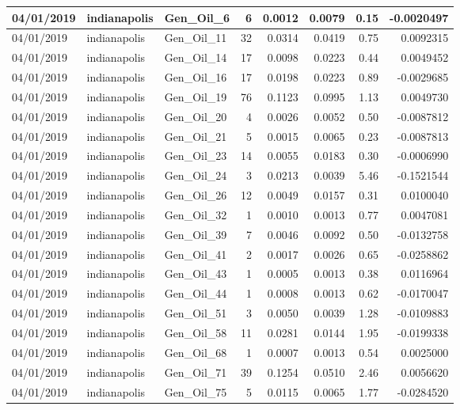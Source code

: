 \documentclass[
  letterpaper,
  DIV=11,
  numbers=noendperiod]{scrartcl}
\begin{document}
\begin{tabular}{l|l|l|r|r|r|r|r}
\hline
04/01/2019 & indianapolis & Gen\_Oil\_6 & 6 & 0.0012 & 0.0079 & 0.15 & -0.0020497\\
\hline
04/01/2019 & indianapolis & Gen\_Oil\_11 & 32 & 0.0314 & 0.0419 & 0.75 & 0.0092315\\
\hline
04/01/2019 & indianapolis & Gen\_Oil\_14 & 17 & 0.0098 & 0.0223 & 0.44 & 0.0049452\\
\hline
04/01/2019 & indianapolis & Gen\_Oil\_16 & 17 & 0.0198 & 0.0223 & 0.89 & -0.0029685\\
\hline
04/01/2019 & indianapolis & Gen\_Oil\_19 & 76 & 0.1123 & 0.0995 & 1.13 & 0.0049730\\
\hline
04/01/2019 & indianapolis & Gen\_Oil\_20 & 4 & 0.0026 & 0.0052 & 0.50 & -0.0087812\\
\hline
04/01/2019 & indianapolis & Gen\_Oil\_21 & 5 & 0.0015 & 0.0065 & 0.23 & -0.0087813\\
\hline
04/01/2019 & indianapolis & Gen\_Oil\_23 & 14 & 0.0055 & 0.0183 & 0.30 & -0.0006990\\
\hline
04/01/2019 & indianapolis & Gen\_Oil\_24 & 3 & 0.0213 & 0.0039 & 5.46 & -0.1521544\\
\hline
04/01/2019 & indianapolis & Gen\_Oil\_26 & 12 & 0.0049 & 0.0157 & 0.31 & 0.0100040\\
\hline
04/01/2019 & indianapolis & Gen\_Oil\_32 & 1 & 0.0010 & 0.0013 & 0.77 & 0.0047081\\
\hline
04/01/2019 & indianapolis & Gen\_Oil\_39 & 7 & 0.0046 & 0.0092 & 0.50 & -0.0132758\\
\hline
04/01/2019 & indianapolis & Gen\_Oil\_41 & 2 & 0.0017 & 0.0026 & 0.65 & -0.0258862\\
\hline
04/01/2019 & indianapolis & Gen\_Oil\_43 & 1 & 0.0005 & 0.0013 & 0.38 & 0.0116964\\
\hline
04/01/2019 & indianapolis & Gen\_Oil\_44 & 1 & 0.0008 & 0.0013 & 0.62 & -0.0170047\\
\hline
04/01/2019 & indianapolis & Gen\_Oil\_51 & 3 & 0.0050 & 0.0039 & 1.28 & -0.0109883\\
\hline
04/01/2019 & indianapolis & Gen\_Oil\_58 & 11 & 0.0281 & 0.0144 & 1.95 & -0.0199338\\
\hline
04/01/2019 & indianapolis & Gen\_Oil\_68 & 1 & 0.0007 & 0.0013 & 0.54 & 0.0025000\\
\hline
04/01/2019 & indianapolis & Gen\_Oil\_71 & 39 & 0.1254 & 0.0510 & 2.46 & 0.0056620\\
\hline
04/01/2019 & indianapolis & Gen\_Oil\_75 & 5 & 0.0115 & 0.0065 & 1.77 & -0.0284520\\

\end{tabular}
\end{document}
